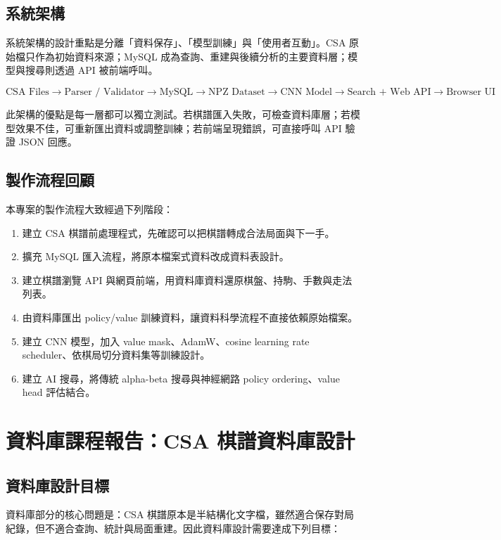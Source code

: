 \documentclass[12pt,a4paper,fontset=none]{ctexart}
\begin{document}
\subsection{系統架構}
系統架構的設計重點是分離「資料保存」、「模型訓練」與「使用者互動」。CSA 原始檔只作為初始資料來源；MySQL 成為查詢、重建與後續分析的主要資料層；模型與搜尋則透過 API 被前端呼叫。

\[
\text{CSA Files}
\rightarrow
\text{Parser / Validator}
\rightarrow
\text{MySQL}
\rightarrow
\text{NPZ Dataset}
\rightarrow
\text{CNN Model}
\rightarrow
\text{Search + Web API}
\rightarrow
\text{Browser UI}
\]

此架構的優點是每一層都可以獨立測試。若棋譜匯入失敗，可檢查資料庫層；若模型效果不佳，可重新匯出資料或調整訓練；若前端呈現錯誤，可直接呼叫 API 驗證 JSON 回應。

\subsection{製作流程回顧}
本專案的製作流程大致經過下列階段：

\begin{enumerate}
  \item 建立 CSA 棋譜前處理程式，先確認可以把棋譜轉成合法局面與下一手。
  \item 擴充 MySQL 匯入流程，將原本檔案式資料改成資料表設計。
  \item 建立棋譜瀏覽 API 與網頁前端，用資料庫資料還原棋盤、持駒、手數與走法列表。
  \item 由資料庫匯出 policy/value 訓練資料，讓資料科學流程不直接依賴原始檔案。
  \item 建立 CNN 模型，加入 value mask、AdamW、cosine learning rate scheduler、依棋局切分資料集等訓練設計。
  \item 建立 AI 搜尋，將傳統 alpha-beta 搜尋與神經網路 policy ordering、value head 評估結合。
\end{enumerate}

\newpage
\section{資料庫課程報告：CSA 棋譜資料庫設計}

\subsection{資料庫設計目標}
資料庫部分的核心問題是：CSA 棋譜原本是半結構化文字檔，雖然適合保存對局紀錄，但不適合查詢、統計與局面重建。因此資料庫設計需要達成下列目標：
\end{document}

